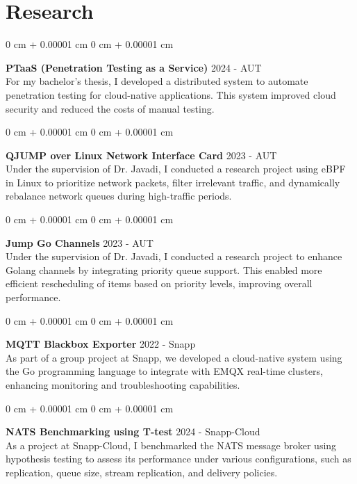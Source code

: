 \documentclass[10pt, letterpaper]{article}
\newenvironment{onecolentry}{
    \begin{adjustwidth}{
        0 cm + 0.00001 cm
    }{
        0 cm + 0.00001 cm
    }
}{
    \end{adjustwidth}
} %
\begin{document}
    \section{Research}
        \begin{samepage}
            \begin{onecolentry}
                \textbf{PTaaS (Penetration Testing as a Service)} \hfill 2024 - AUT\\
                \noindent\justifying
                For my bachelor's thesis, I developed a distributed system to automate penetration testing for cloud-native applications. This system improved cloud security and reduced the costs of manual testing.
            \end{onecolentry}
            \vspace{0.15 cm}
            \begin{onecolentry}
                \textbf{QJUMP over Linux Network Interface Card} \hfill 2023 - AUT\\
                \noindent\justifying
                Under the supervision of Dr. Javadi, I conducted a research project using eBPF in Linux to prioritize network packets, filter irrelevant traffic, and dynamically rebalance network queues during high-traffic periods.
            \end{onecolentry}
            \vspace{0.15 cm}
            \begin{onecolentry}
                \textbf{Jump Go Channels} \hfill 2023 - AUT\\
                \noindent\justifying
                Under the supervision of Dr. Javadi, I conducted a research project to enhance Golang channels by integrating priority queue support. This enabled more efficient rescheduling of items based on priority levels, improving overall performance.
            \end{onecolentry}
            \vspace{0.15 cm}
            \begin{onecolentry}
                \textbf{MQTT Blackbox Exporter} \hfill 2022 - Snapp\\
                \noindent\justifying
                As part of a group project at Snapp, we developed a cloud-native system using the Go programming language to integrate with EMQX real-time clusters, enhancing monitoring and troubleshooting capabilities.
            \end{onecolentry}
            \vspace{0.15 cm}
            \begin{onecolentry}
                \textbf{NATS Benchmarking using T-test} \hfill 2024 - Snapp-Cloud\\
                \noindent\justifying
                As a project at Snapp-Cloud, I benchmarked the NATS message broker using hypothesis testing to assess its performance under various configurations, such as replication, queue size, stream replication, and delivery policies.
            \end{onecolentry}
        \end{samepage}
\end{document}
